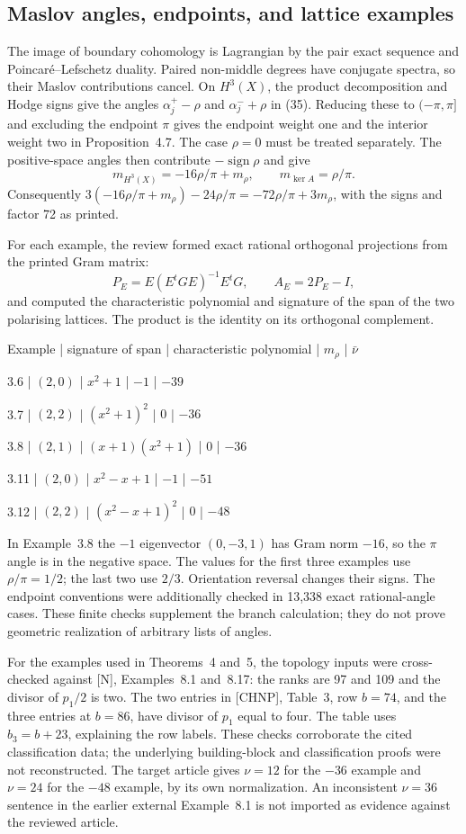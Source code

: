 \documentclass[10pt]{article}
\begin{document}
\subsection*{Maslov angles, endpoints, and lattice examples}
The image of boundary cohomology is Lagrangian by the pair exact sequence and Poincaré–Lefschetz duality. Paired non-middle degrees have conjugate spectra, so their Maslov contributions cancel. On \(H^3(X)\), the product decomposition and Hodge signs give the angles \(\alpha_j^+-\rho\) and \(\alpha_j^-+\rho\) in (35). Reducing these to \((-\pi,\pi]\) and excluding the endpoint \(\pi\) gives the endpoint weight one and the interior weight two in Proposition 4.7. The case \(\rho=0\) must be treated separately. The positive-space angles then contribute \(-\operatorname{sign}\rho\) and give \[m_{H^3(X)}=-16\rho/\pi+m_\rho,\qquad
 m_{\ker A}=\rho/\pi.\] Consequently \(3(-16\rho/\pi+m_\rho)-24\rho/\pi
=-72\rho/\pi+3m_\rho\), with the signs and factor 72 as printed.\par
For each example, the review formed exact rational orthogonal projections from the printed Gram matrix: \[P_E=E(E^tGE)^{-1}E^tG,\qquad A_E=2P_E-I,\] and computed the characteristic polynomial and signature of the span of the two polarising lattices. The product is the identity on its orthogonal complement.\par
Example | signature of span | characteristic polynomial | \(m_\rho\) | \(\bar\nu\)\par
3.6 | \((2,0)\) | \(x^2+1\) | \(-1\) | \(-39\)\par
3.7 | \((2,2)\) | \((x^2+1)^2\) | \(0\) | \(-36\)\par
3.8 | \((2,1)\) | \((x+1)(x^2+1)\) | \(0\) | \(-36\)\par
3.11 | \((2,0)\) | \(x^2-x+1\) | \(-1\) | \(-51\)\par
3.12 | \((2,2)\) | \((x^2-x+1)^2\) | \(0\) | \(-48\)\par
In Example 3.8 the \(-1\) eigenvector \((0,-3,1)\) has Gram norm \(-16\), so the \(\pi\) angle is in the negative space. The values for the first three examples use \(\rho/\pi=1/2\); the last two use \(2/3\). Orientation reversal changes their signs. The endpoint conventions were additionally checked in 13,338 exact rational-angle cases. These finite checks supplement the branch calculation; they do not prove geometric realization of arbitrary lists of angles.\par
For the examples used in Theorems 4 and 5, the topology inputs were cross-checked against [N], Examples 8.1 and 8.17: the ranks are 97 and 109 and the divisor of \(p_1/2\) is two. The two entries in [CHNP], Table 3, row \(b=74\), and the three entries at \(b=86\), have divisor of \(p_1\) equal to four. The table uses \(b_3=b+23\), explaining the row labels. These checks corroborate the cited classification data; the underlying building-block and classification proofs were not reconstructed. The target article gives \(\nu=12\) for the \(-36\) example and \(\nu=24\) for the \(-48\) example, by its own normalization. An inconsistent \(\nu=36\) sentence in the earlier external Example 8.1 is not imported as evidence against the reviewed article.\par
\end{document}
